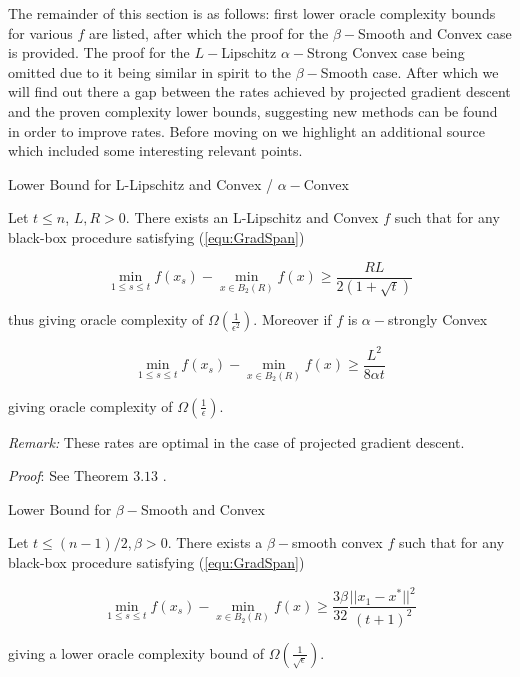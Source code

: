 The remainder of this section is as follows: first lower oracle complexity bounds for various $f$ are listed, after which the proof for the $\beta-$Smooth and Convex case is provided. The proof for the $L-$Lipschitz $\alpha-$Strong Convex case being omitted due to it being similar in spirit to the $\beta-$Smooth case. After which we will find out there a gap between the rates achieved by projected gradient descent and the proven complexity lower bounds, suggesting new methods can be found in order to improve rates. Before moving on we highlight an additional source \cite[75-76]{bach} which included some interesting relevant points.


\begin{theorem}{Lower Bound for L-Lipschitz and Convex / $\alpha-$Convex }

Let  $t \leq n$, $L,R > 0$. There exists an L-Lipschitz and Convex $f$ such that for any black-box procedure satisfying (\ref{equ:GradSpan})

\begin{equation}
\min_{1 \leq s \leq t} f(x_s) - \min_{x \in B_2(R)}f(x) \geq \frac{RL}{2(1+\sqrt{t})}
\end{equation} 

thus giving oracle complexity of $\Omega\left(\frac{1}{\epsilon^2}\right)$.  Moreover if $f$ is $\alpha-$strongly  Convex  

\begin{equation}
\min_{1 \leq s \leq t} f(x_s) - \min_{x \in B_2(R)}f(x) \geq \frac{L^2}{8 \alpha t}
\end{equation} 

giving oracle complexity of $\Omega\left(\frac{1}{\epsilon}\right)$.

\textit{Remark:} These rates are optimal in the case of projected gradient descent. 

\textit{Proof}: See Theorem $3.13$ \cite{bubeck}.
\end{theorem}





\begin{theorem}\label{lower_bound_smooth}{Lower Bound for $\beta-$Smooth and Convex}

Let $t \leq (n-1)/2, \beta > 0$. There exists a $\beta-$smooth convex $f$ such that for any black-box procedure satisfying (\ref{equ:GradSpan})

\begin{equation}
\min_{1 \leq s \leq t} f(x_s) - \min_{x \in B_2(R)}f(x) \geq \frac{3\beta}{32} \frac{||x_1 - x^{*}||^2}{(t+1)^2}
\label{equ:LowerBoundBetaSmooth}
\end{equation} 


giving a lower oracle  complexity  bound of $\Omega\left(\frac{1}{\sqrt{\epsilon}}\right)$.
\label{Theorem:LowerBoundBeta}
\end{theorem}


